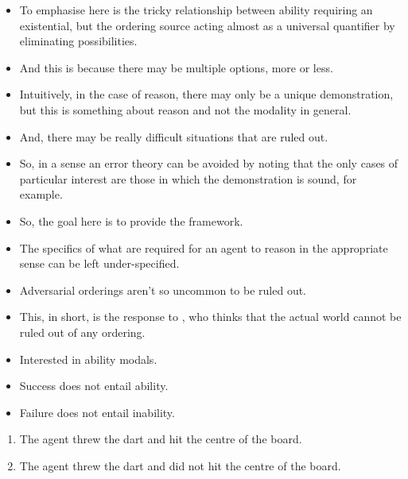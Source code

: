 \documentclass[10pt]{article}
\begin{document}
\begin{itemize}
\item To emphasise here is the tricky relationship between ability requiring an existential, but the ordering source acting almost as a universal quantifier by eliminating possibilities.
\item And this is because there may be multiple options, more or less.
\item Intuitively, in the case of reason, there may only be a unique demonstration, but this is something about reason and not the modality in general.
\item And, there may be really difficult situations that are ruled out.
\item So, in a sense an error theory can be avoided by noting that the only cases of particular interest are those in which the demonstration is sound, for example.
\end{itemize}

\begin{itemize}
\item So, the goal here is to provide the framework.
\item The specifics of what are required for an agent to reason in the appropriate sense can be left under-specified.
\end{itemize}

\begin{itemize}
\item Adversarial orderings aren't so uncommon to be ruled out.
\item This, in short, is the response to \citeauthor{Schwarz:2020aa}, who thinks that the actual world cannot be ruled out of any ordering.
\end{itemize}

\newpage

\begin{itemize}
\item Interested in ability modals.
\item Success does not entail ability.
\item Failure does not entail inability.
\end{itemize}

\begin{enumerate}
\item The agent threw the dart and hit the centre of the board.
\item The agent threw the dart and did not hit the centre of the board.
\end{enumerate}
\end{document}
